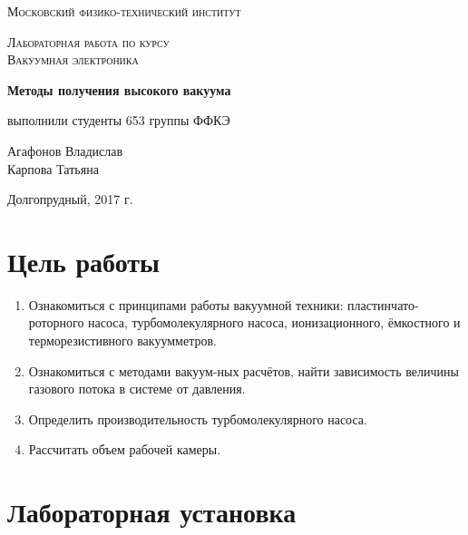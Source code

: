 \documentclass{article}
\begin{document}
\begin{titlepage}
	\centering
	{\scshape\LARGE Московский физико-технический институт \par}
	\vspace{3cm}
	{\scshape\Large Лабораторная работа по курсу\\ Вакуумная электроника \par}
	\vspace{1cm}
	{\huge\bfseries Методы получения высокого вакуума \par}
	\vspace{1cm}
	\vfill
\begin{flushright}
	{\large выполнили студенты 653 группы ФФКЭ}\par
	\vspace{0.3cm}
	{\LARGE Агафонов Владислав}\\
	{\LARGE Карпова Татьяна} %
\end{flushright}

	\vfill

Долгопрудный, 2017 г.
\end{titlepage}
\newpage

\tableofcontents


\section{Цель работы}
\begin{enumerate}
    \item Ознакомиться с принципами работы вакуумной техники: пластинчато-роторного насоса, турбомолекулярного насоса, ионизационного, ёмкостного и терморезистивного вакуумметров.
    \item Ознакомиться с методами вакуум-ных расчётов, найти зависимость величины газового потока в системе от давления.
    \item Определить производительность турбомолекулярного насоса.
    \item Рассчитать объем рабочей камеры.
\end{enumerate}

\section{Лабораторная установка}
\end{document}
